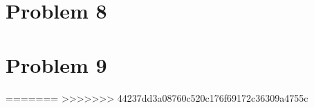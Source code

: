 \documentclass[aps,rmp,preprint,amsmath,amssymb,longbibliography,floatfix]{revtex4-1}
\begin{document}
\section{Problem 8}
\label{sec:prob8}



\section{Problem 9}
\label{sec:prob9}


=======
>>>>>>> 44237dd3a08760c520c176f69172c36309a4755c





\newpage


\appendix

\end{document}
